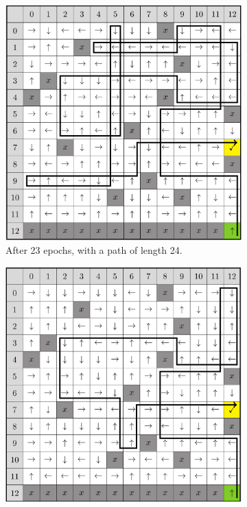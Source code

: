 \renewcommand{\textuparrow}{\ensuremath{\upa{}}}
\renewcommand{\textdownarrow}{\ensuremath{\downa{}}}
\renewcommand{\textleftarrow}{\ensuremath{\lefta{}}}
\renewcommand{\textrightarrow}{\ensuremath{\righta{}}}
\begin{figure}[H]
	\centering
	\begin{subfigure}[t]{.42\textwidth}
		\includegraphics[width=\textwidth]{bad_map.png}
		\caption{After 23 epochs, with a path of length 24.}
	\end{subfigure}
	\begin{subfigure}[t]{.42\textwidth}
		\includegraphics[width=\textwidth]{good_map.png}

\end{subfigure}
\end{figure}
